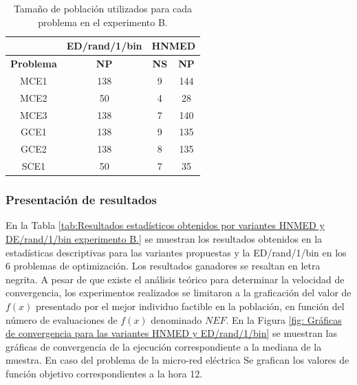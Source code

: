 \begin{table}[]
	\centering
	\caption{Tamaño de población utilizados para cada problema en el experimento B.}
	\label{tab:Tamaño de población utilizados para cada problema en el experimento B.}
	\begin{tabular}{cccc}
		& \textbf{ED/rand/1/bin }& \multicolumn{2}{l}{\textbf{HNMED}} \\
		\hline
		\textbf{Problema} & \textbf{NP}            & \textbf{NS}          & \textbf{NP}          \\
		\hline
		MCE1     & 138           & 9           & 144         \\
		MCE2     & 50            & 4           & 28          \\
		MCE3     & 138           & 7           & 140         \\
		GCE1     & 138           & 9           & 135         \\
		GCE2     & 138           & 8           & 135         \\
		SCE1     & 50            & 7           & 35         
	\end{tabular}
\end{table}

\subsubsection{Presentación de resultados}
En la Tabla \ref{tab:Resultados estadísticos obtenidos por variantes HNMED y DE/rand/1/bin  experimento B.} se muestran los resultados obtenidos en la estadísticas descriptivas para las variantes propuestas y la ED/rand/1/bin en los 6 problemas de optimización. Los resultados ganadores se resaltan en letra negrita. A pesar de que existe el análisis teórico para determinar la velocidad de convergencia, los experimentos realizados se limitaron a la graficación del valor de $f(x)$ presentado por el mejor individuo factible en la población, en función del número de evaluaciones de $f(x)$ denominado $NEF$. En la Figura \ref{fig: Gráficas de convergencia para las variantes HNMED y ED/rand/1/bin} se muestran las gráficas de convergencia de la ejecución correspondiente a la mediana de la muestra. En caso del problema de la micro-red eléctrica Se grafican los valores de función objetivo correspondientes a la hora 12.   

